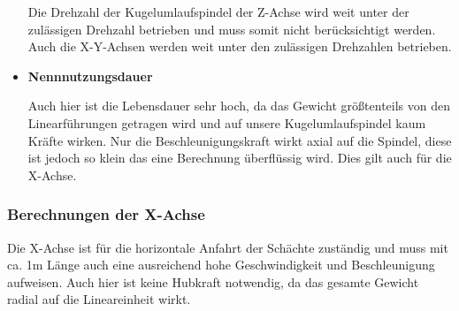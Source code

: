 \documentclass{scrartcl}
\begin{document}
\begin{itemize}
Die Drehzahl der Kugelumlaufspindel der Z-Achse wird weit unter der zulässigen Drehzahl betrieben und muss somit nicht berücksichtigt werden. Auch die X-Y-Achsen werden weit unter den zulässigen Drehzahlen betrieben.



\item \textbf{Nennnutzungsdauer}


Auch hier ist die Lebensdauer sehr hoch, da das Gewicht größtenteils von den Linearführungen getragen wird und auf unsere Kugelumlaufspindel kaum Kräfte wirken. Nur die Beschleunigungskraft wirkt axial auf die Spindel, diese ist jedoch so klein das eine Berechnung überflüssig wird. Dies gilt auch für die X-Achse.


\end{itemize}








\subsubsection{Berechnungen der X-Achse}

Die X-Achse ist für die horizontale Anfahrt der Schächte zuständig und muss mit ca. 1m Länge auch eine ausreichend 
hohe Geschwindigkeit und Beschleunigung aufweisen. Auch hier ist keine Hubkraft notwendig, da das gesamte Gewicht 
radial auf die Lineareinheit wirkt. 
\end{document}
